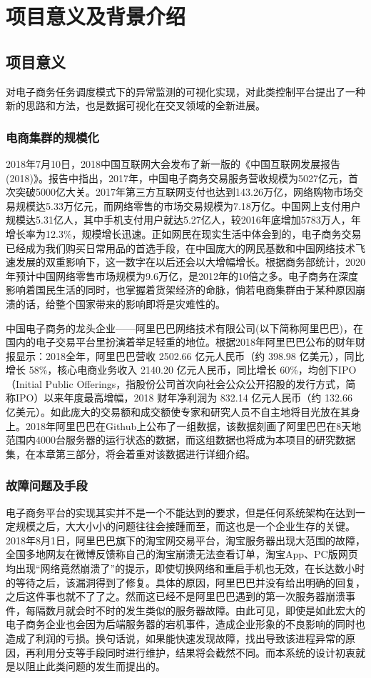 \chapter{项目意义及背景介绍}
\section{项目意义}
对电子商务任务调度模式下的异常监测的可视化实现，对此类控制平台提出了一种新的思路和方法，也是数据可视化在交叉领域的全新进展。
\subsection{电商集群的规模化}
2018年7月10日，2018中国互联网大会发布了新一版的《中国互联网发展报告(2018)》。报告中指出，2017年，中国电子商务交易服务营收规模为5027亿元，首次突破5000亿大关。2017年第三方互联网支付也达到143.26万亿，网络购物市场交易规模达5.33万亿元，而网络零售的市场交易规模为7.18万亿。中国网上支付用户规模达5.31亿人，其中手机支付用户就达5.27亿人，较2016年底增加5783万人，年增长率为12.3\%，规模增长迅速。正如网民在现实生活中体会到的，电子商务交易已经成为我们购买日常用品的首选手段，在中国庞大的网民基数和中国网络技术飞速发展的双重影响下，这一数字在以后还会以大增幅增长。根据商务部统计，2020年预计中国网络零售市场规模为9.6万亿，是2012年的10倍之多。电子商务在深度影响着国民生活的同时，也掌握着货架经济的命脉，倘若电商集群由于某种原因崩溃的话，给整个国家带来的影响即将是灾难性的。

中国电子商务的龙头企业——阿里巴巴网络技术有限公司(以下简称阿里巴巴)，在国内的电子交易平台里扮演着举足轻重的地位。根据2018年阿里巴巴公布的财年财报显示：2018全年，阿里巴巴营收 2502.66 亿元人民币（约 398.98 亿美元），同比增长 58\%，核心电商业务收入 2140.20 亿元人民币，同比增长 60\%，均创下IPO（Initial Public Offerings，指股份公司首次向社会公众公开招股的发行方式，简称IPO）以来年度最高增幅，2018 财年净利润为 832.14 亿元人民币（约 132.66 亿美元）。如此庞大的交易额和成交额使专家和研究人员不自主地将目光放在其身上。2018年阿里巴巴在Github上公布了一组数据，该数据刻画了阿里巴巴在8天地范围内4000台服务器的运行状态的数据，而这组数据也将成为本项目的研究数据集，在本章第三部分，将会着重对该数据进行详细介绍。

\subsection{故障问题及手段}
电子商务平台的实现其实并不是一个不能达到的要求，但是任何系统架构在达到一定规模之后，大大小小的问题往往会接踵而至，而这也是一个企业生存的关键。2018年8月1日，阿里巴巴旗下的淘宝网交易平台，淘宝服务器出现大范围的故障，全国多地网友在微博反馈称自己的淘宝崩溃无法查看订单，淘宝App、PC版网页均出现“网络竟然崩溃了”的提示，即使切换网络和重启手机也无效，在长达数小时的等待之后，该漏洞得到了修复。具体的原因，阿里巴巴并没有给出明确的回复，之后这件事也就不了了之。然而这已经不是阿里巴巴遇到的第一次服务器崩溃事件，每隔数月就会时不时的发生类似的服务器故障。由此可见，即使是如此宏大的电子商务企业也会因为后端服务器的宕机事件，造成企业形象的不良影响的同时也造成了利润的亏损。换句话说，如果能快速发现故障，找出导致该进程异常的原因，再利用分支等手段同时进行维护，结果将会截然不同。而本系统的设计初衷就是以阻止此类问题的发生而提出的。
